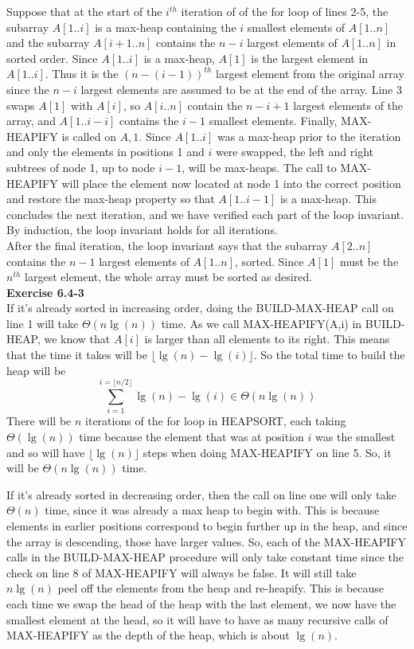 \documentclass{article}
\begin{document}
Suppose that at the start of the $i^{th}$ iteration of of the for loop of lines 2-5, the subarray $A[1..i]$ is a max-heap containing the $i$ smallest elements of $A[1..n]$ and the subarray $A[i+1..n]$ contains the $n-i$ largest elements of $A[1..n]$ in sorted order. Since $A[1..i]$ is a max-heap, $A[1]$ is the largest element in $A[1..i]$. Thus it is the $(n-(i-1))^{th}$ largest element from the original array since the $n-i$ largest elements are assumed to be at the end of the array.  Line 3 swaps $A[1]$ with $A[i]$, so $A[i..n]$ contain the $n-i+1$ largest elements of the array, and $A[1..i-i]$ contains the $i-1$ smallest elements.  Finally, MAX-HEAPIFY is called on $A,1$.  Since $A[1..i]$ was a max-heap prior to the iteration and only the elements in positions 1 and $i$ were swapped, the left and right subtrees of node 1, up to node $i-1$, will be max-heaps.  The call to MAX-HEAPIFY will place the element now located at node 1 into the correct position and restore the max-heap property so that $A[1..i-1]$ is a max-heap.  This concludes the next iteration, and we have verified each part of the loop invariant.  By induction, the loop invariant holds for all iterations.\\

After the final iteration, the loop invariant says that the subarray $A[2..n]$ contains the $n-1$ largest elements of $A[1..n]$, sorted.  Since $A[1]$ must be the $n^{th}$ largest element, the whole array must be sorted as desired. \\

\noindent\textbf{Exercise 6.4-3}\\

If it's already sorted in increasing order, doing the BUILD-MAX-HEAP call on line 1 will take $\Theta(n\lg(n))$ time. As we call MAX-HEAPIFY(A,i) in BUILD-HEAP, we know that $A[i]$ is larger than all elements to its right. This means that the time it takes will be $\lfloor \lg(n) - \lg(i) \rfloor$. So the total time to build the heap will be 
\[
\sum_{i=1}^{i=\lfloor n/2\rfloor} \lg(n) - \lg(i) \in \Theta(n\lg(n))
\]
 There will be $n$ iterations of the for loop in HEAPSORT, each taking $\Theta(\lg(n))$ time because the element that was at position $i$ was the smallest and so will have $\lfloor \lg(n)\rfloor$ steps when doing MAX-HEAPIFY on line 5. So, it will be $\Theta(n\lg(n))$ time.

If it's already sorted in decreasing order, then the call on line one will only take $\Theta(n)$ time, since it was already a max heap to begin with. This is because elements in earlier positions correspond to begin further up in the heap, and since the array is descending, those have larger values. So, each of the MAX-HEAPIFY calls in the BUILD-MAX-HEAP procedure will only take constant time since the check on line 8 of MAX-HEAPIFY will always be false. It will still take $n\lg(n)$ peel off the elements from the heap and re-heapify. This is because each time we swap the head of the heap with the last element, we now have the smallest element at the head, so it will have to have as many recursive calls of MAX-HEAPIFY as the depth of the heap, which is about $\lg(n)$. \\
\end{document}
